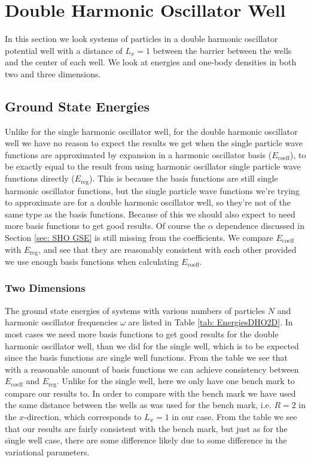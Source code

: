 \documentclass[../main.tex]{subfiles}
\begin{document}
\section{Double Harmonic Oscillator Well}

In this section we look systems of particles in a double harmonic oscillator potential well with a distance of $L_x = 1$ between the barrier between the wells and the center of each well. We look at energies and one-body densities in both two and three dimensions.

\subsection{Ground State Energies}

Unlike for the single harmonic oscillator well, for the double harmonic oscillator well we have no reason to expect the results we get when the single particle wave functions are approximated by expansion in a harmonic oscillator basis ($E_\textrm{coeff}$), to be exactly equal to the result from using harmonic oscillator single particle wave functions directly ($E_\textrm{reg}$). This is because the basis functions are still single harmonic oscillator functions, but the single particle wave functions we're trying to approximate are for a double harmonic oscillator well, so they're not of the same type as the basis functions. Because of this we should also expect to need more basis functions to get good results. Of course the $\alpha$ dependence discussed in Section \ref{sec: SHO GSE} is still missing from the coefficients. We compare $E_\textrm{coeff}$ with $E_\textrm{reg}$, and see that they are reasonably consistent with each other provided we use enough basis functions when calculating $E_\textrm{coeff}$.

\subsubsection{Two Dimensions}

The ground state energies of systems with various numbers of particles $N$ and harmonic oscillator frequencies $\omega$ are listed in Table \ref{tab: EnergiesDHO2D}. In most cases we need more basis functions to get good results for the double harmonic oscillator well, than we did for the single well, which is to be expected since the basis functions are single well functions. From the table we see that with a reasonable amount of basis functions we can achieve consistency between $E_\textrm{coeff}$ and $E_\textrm{reg}$. Unlike for the single well, here we only have one bench mark to compare our results to. In order to compare with the bench mark we have used the same distance between the wells as was used for the bench mark, i.e. $R=2$ in the $x$-direction, which corresponds to $L_x = 1$ in our case. From the table we see that our results are fairly consistent with the bench mark, but just as for the single well case, there are some difference likely due to some difference in the variational parameters.
\end{document}
